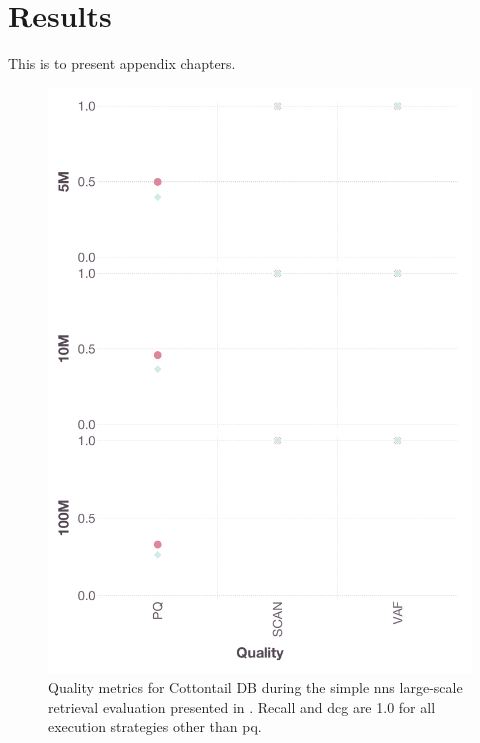 \chapter{Results}
\label{chapter:appendix_results}

This is to present appendix chapters.

\begin{figure}[p]
    \includegraphics[width=\linewidth]{figures/bignns-cottontail-NNS-quality}
    \caption{Quality metrics for Cottontail DB during the simple \acrshort{nns} large-scale retrieval evaluation presented in . Recall and \acrshort{dcg} are 1.0 for all execution strategies other than \acrshort{pq}.}
\end{figure}

